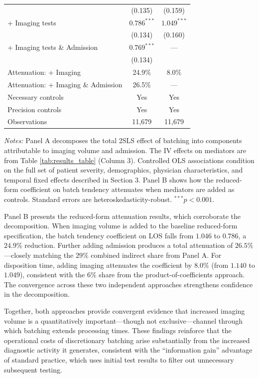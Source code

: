 \documentclass[,,blindrev]{informs}
\begin{document}
\begin{table}[t!]
\begin{threeparttable}
\begin{tabular}{p{11cm}cc}
& (0.135) & (0.159) \\[0.25em]
\quad + Imaging tests 
& $0.786^{***}$ & $1.049^{***}$ \\
& (0.134) & (0.160) \\[0.25em]
\quad + Imaging tests \& Admission 
& $0.769^{***}$ & --- \\
& (0.134) & \\[0.5em]
\quad Attenuation: + Imaging
& 24.9\% & 8.0\% \\[0.25em]
\quad Attenuation: + Imaging \& Admission
& 26.5\% & --- \\[0.75em]
\midrule
Necessary controls & Yes & Yes \\
Precision controls & Yes & Yes \\
Observations & 11{,}679 & 11{,}679 \\
\bottomrule
\end{tabular}
\begin{flushleft}
\footnotesize
\textit{Notes:} Panel A decomposes the total 2SLS effect of batching into components attributable to imaging volume and admission. The IV effects on mediators are from Table \ref{tab:results_table} (Column 3). Controlled OLS associations condition on the full set of patient severity, demographics, physician characteristics, and temporal fixed effects described in Section 3. Panel B shows how the reduced-form coefficient on batch tendency attenuates when mediators are added as controls. Standard errors are heteroskedasticity-robust.
$^{***} p < 0.001$.
\end{flushleft}
\end{threeparttable}
\end{table}

Panel B presents the reduced-form attenuation results, which corroborate
the decomposition. When imaging volume is added to the baseline
reduced-form specification, the batch tendency coefficient on LOS falls
from \(1.046\) to \(0.786\), a \(24.9\%\) reduction. Further adding
admission produces a total attenuation of \(26.5\%\)---closely matching
the \(29\%\) combined indirect share from Panel A. For disposition time,
adding imaging attenuates the coefficient by \(8.0\%\) (from \(1.140\)
to \(1.049\)), consistent with the \(6\%\) share from the
product-of-coefficients approach. The convergence across these two
independent approaches strengthens confidence in the decomposition.

Together, both approaches provide convergent evidence that increased
imaging volume is a quantitatively important---though not
exclusive---channel through which batching extends processing times.
These findings reinforce that the operational costs of discretionary
batching arise substantially from the increased diagnostic activity it
generates, consistent with the ``information gain'' advantage of
standard practice, which uses initial test results to filter out
unnecessary subsequent testing.
\end{document}
